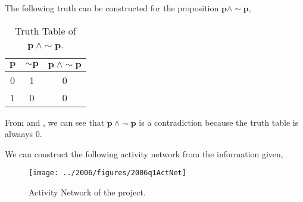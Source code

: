 \begin{subquestions}
\begin{subsubquestions}
\subsubquestion

The following truth can be constructed for the proposition $\boldsymbol{p \land \sim p}$,

\begin{table}[ht]
	\centering
	\begin{tabular}{|c|c|c|}
		\hline
		$\boldsymbol{p}$ & $\boldsymbol{\sim p}$ & $\boldsymbol{p ~\land \sim p}$ \\
		\hline
		0 & 1 & 0 \\
		1 & 0 & 0 \\ 
		\hline
	\end{tabular}
	\caption{\label{2006:q1:tab:TruthTab2} Truth Table of $\boldsymbol{p ~\land \sim p}$.}
\end{table}

From  and , we can see that $\boldsymbol{p ~\land \sim p}$ is a contradiction because the truth table is alwaays 0.

\end{subsubquestions}


\subquestion

We can construct the following activity network from the information given,
\begin{figure}[H]
	\begin{center}
		\texttt{[image: ../2006/figures/2006q1ActNet]}
		\caption{\label{2006:q1:fig:ActNet} Activity Network of the project.}
	\end{center}
\end{figure}

\end{subquestions}

